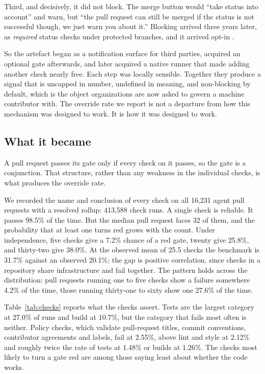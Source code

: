 \documentclass[mnsc]{informs4}
\begin{document}
Third, and decisively, it did not block. The merge button would ``take status into
account'' and warn, but ``the pull request can still be merged if the status is not
successful though, we just warn you about it.'' Blocking arrived three years later,
as \emph{required} status checks under protected branches, and it arrived opt-in
\citep{github2015protected}.

So the artefact began as a notification surface for third parties, acquired an
optional gate afterwards, and later acquired a native runner that made adding
another check nearly free. Each step was locally sensible. Together they produce a
signal that is uncapped in number, undefined in meaning, and non-blocking by
default, which is the object organizations are now asked to govern a machine
contributor with. The override rate we report is not a departure from how this
mechanism was designed to work. It is how it was designed to work.

\subsection{What it became}
\label{sec:mechanism}

A pull request passes its gate only if every check on it passes, so the gate is a
conjunction. That structure, rather than any weakness in the individual checks, is
what produces the override rate.

We recorded the name and conclusion of every check on all 16,231 agent pull
requests with a resolved rollup: 413,588 check runs. A single check is reliable.
It passes 98.5\% of the time. But the median pull request faces 32 of them, and
the probability that at least one turns red grows with the count. Under
independence, five checks give a 7.2\% chance of a red gate, twenty give 25.8\%,
and thirty-two give 38.0\%. At the observed mean of 25.5 checks the benchmark is
31.7\% against an observed 20.1\%; the gap is positive correlation, since checks in
a repository share infrastructure and fail together. The pattern holds across the
distribution: pull requests running one to five checks show a failure somewhere
4.2\% of the time, those running thirty-one to sixty show one 27.6\% of the time.

Table~\ref{tab:checks} reports what the checks assert. Tests are the largest
category at 27.0\% of runs and build at 10.7\%, but the category that fails most
often is neither. Policy checks, which validate pull-request titles, commit
conventions, contributor agreements and labels, fail at 2.55\%, above lint and
style at 2.12\% and roughly twice the rate of tests at 1.48\% or builds at 1.26\%.
The checks most likely to turn a gate red are among those saying least about
whether the code works.
\end{document}
